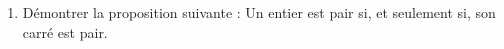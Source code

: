 \begin{exo}{}
	\begin{enumerate}
		\item Démontrer la proposition suivante : \og{} Un entier est pair si, et seulement si, son carré est pair. \fg{}
	\end{enumerate}
\end{exo}
